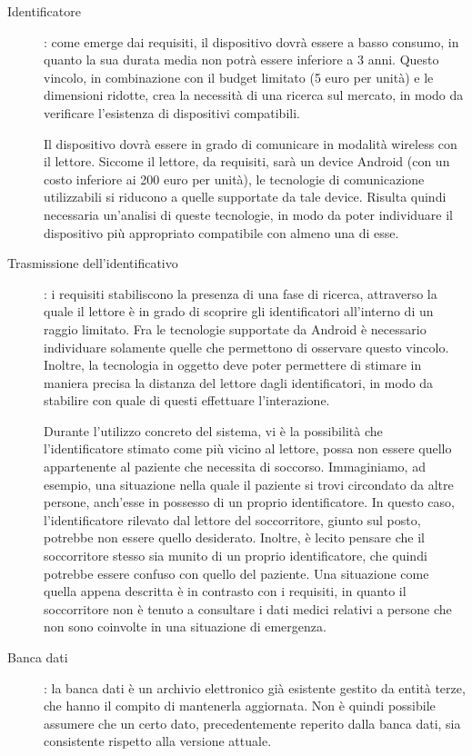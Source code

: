 \documentclass[a4paper,12pt]{report}
\begin{document}
\begin{description}
	\item[Identificatore]: come emerge dai requisiti, il dispositivo dovrà essere a basso consumo, in quanto la sua durata media non potrà essere inferiore a 3 anni. Questo vincolo, in combinazione con il budget limitato (5 euro per unità) e le dimensioni ridotte, crea la necessità di una ricerca sul mercato, in modo da verificare l'esistenza di dispositivi compatibili.
	
	Il dispositivo dovrà essere in grado di comunicare in modalità wireless con il lettore. Siccome il lettore, da requisiti, sarà un device Android (con un costo inferiore ai 200 euro per unità), le tecnologie di comunicazione utilizzabili si riducono a quelle supportate da tale device. Risulta quindi necessaria un'analisi di queste tecnologie, in modo da poter individuare il dispositivo più appropriato compatibile con almeno una di esse. 
	
	\item[Trasmissione dell'identificativo]: i requisiti stabiliscono la presenza di una fase di ricerca, attraverso la quale il lettore è in grado di scoprire gli identificatori all'interno di un raggio limitato. Fra le tecnologie supportate da Android è necessario individuare solamente quelle che permettono di osservare questo vincolo. Inoltre, la tecnologia in oggetto deve poter permettere di stimare in maniera precisa la distanza del lettore dagli identificatori, in modo da stabilire con quale di questi effettuare l'interazione.
	
	Durante l'utilizzo concreto del sistema, vi è la possibilità che l'identificatore stimato come più vicino al lettore, possa non essere quello appartenente al paziente che necessita di soccorso. Immaginiamo, ad esempio, una situazione nella quale il paziente si trovi circondato da altre persone, anch'esse in possesso di un proprio identificatore. In questo caso, l'identificatore rilevato dal lettore del soccorritore, giunto sul posto, potrebbe non essere quello desiderato. Inoltre, è lecito pensare che il soccorritore stesso sia munito di un proprio identificatore, che quindi potrebbe essere confuso con quello del paziente. Una situazione come quella appena descritta è in contrasto con i requisiti, in quanto il soccorritore non è tenuto a consultare i dati medici relativi a persone che non sono coinvolte in una situazione di emergenza. 
	
	\item[Banca dati]: la banca dati è un archivio elettronico già esistente gestito da entità terze, che hanno il compito di mantenerla aggiornata. Non è quindi possibile assumere che un certo dato, precedentemente reperito dalla banca dati, sia consistente rispetto alla versione attuale. 
	

\end{description}
\end{document}
